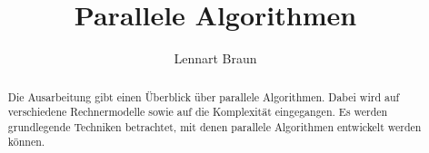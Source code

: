 \documentclass[a4paper]{llncs}
\begin{document}
\pagestyle{headings}

\title{Parallele Algorithmen}

\author{Lennart Braun}


\maketitle

\begin{abstract}
Die Ausarbeitung gibt einen Überblick über parallele Algorithmen.
Dabei wird auf verschiedene Rechnermodelle sowie auf die Komplexität
eingegangen.
Es werden grundlegende Techniken betrachtet, mit denen parallele Algorithmen
entwickelt werden können.

\end{abstract}

\tableofcontents

\newpage








\clearpage
\printbibliography
\end{document}
